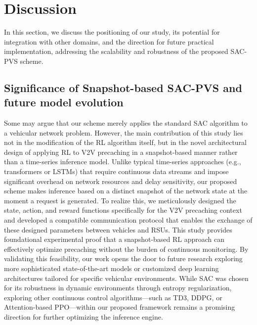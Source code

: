 \documentclass{aims}
\numberwithin{equation}{section}
\begin{document}
\section{Discussion} \label{sec.disc}
In this section, we discuss the positioning of our study, its potential for integration with other domains, and the direction for future practical implementation, addressing the scalability and robustness of the proposed SAC-PVS scheme.

\subsection{Significance of Snapshot-based SAC-PVS and future model evolution}
Some may argue that our scheme merely applies the standard SAC algorithm to a vehicular network problem.
However, the main contribution of this study lies not in the modification of the RL algorithm itself, but in the novel architectural design of applying RL to V2V precaching in a snapshot-based manner rather than a time-series inference model.
Unlike typical time-series approaches (e.g., transformers or LSTMs) that require continuous data streams and impose significant overhead on network resources and delay sensitivity, our proposed scheme makes inference based on a distinct snapshot of the network state at the moment a request is generated.
To realize this, we meticulously designed the state, action, and reward functions specifically for the V2V precaching context and developed a compatible communication protocol that enables the exchange of these designed parameters between vehicles and RSUs.
This study provides foundational experimental proof that a snapshot-based RL approach can effectively optimize precaching without the burden of continuous monitoring.
By validating this feasibility, our work opens the door to future research exploring more sophisticated state-of-the-art models or customized deep learning architectures tailored for specific vehicular environments.
While SAC was chosen for its robustness in dynamic environments through entropy regularization, exploring other continuous control algorithms—such as TD3, DDPG, or Attention-based PPO—within our proposed framework remains a promising direction for further optimizing the inference engine.
\end{document}
